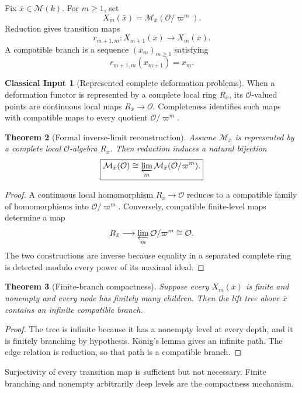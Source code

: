 \documentclass[11pt]{article}
\newtheorem{theorem}{Theorem}[section]
\theoremstyle{definition}
\newtheorem{classicalinput}[theorem]{Classical Input}
\theoremstyle{remark}
\newcommand{\Ocal}{\mathcal O}
\begin{document}
Fix \(\bar x\in\mathcal M(k)\).  For \(m\ge1\), set
\[
X_m(\bar x)=\mathcal M_{\bar x}(\Ocal/\varpi^m).
\]
Reduction gives transition maps
\[
r_{m+1,m}:X_{m+1}(\bar x)\longrightarrow X_m(\bar x).
\]
A compatible branch is a sequence \((x_m)_{m\ge1}\) satisfying
\[
r_{m+1,m}(x_{m+1})=x_m.
\]

\begin{classicalinput}[Represented complete deformation problems]
When a deformation functor is represented by a complete local ring \(R_{\bar x}\), its \(\Ocal\)-valued points are continuous local maps \(R_{\bar x}\to\Ocal\).  Completeness identifies such maps with compatible maps to every quotient \(\Ocal/\varpi^m\).
\end{classicalinput}

\begin{theorem}[Formal inverse-limit reconstruction]
Assume \(\mathcal M_{\bar x}\) is represented by a complete local \(\Ocal\)-algebra \(R_{\bar x}\).  Then reduction induces a natural bijection
\[
\boxed{
\mathcal M_{\bar x}(\Ocal)
\cong
\varprojlim_m
\mathcal M_{\bar x}(\Ocal/\varpi^m).
}
\]
\end{theorem}

\begin{proof}
A continuous local homomorphism \(R_{\bar x}\to\Ocal\) reduces to a compatible family of homomorphisms into \(\Ocal/\varpi^m\).  Conversely, compatible finite-level maps determine a map
\[
R_{\bar x}\longrightarrow\varprojlim_m\Ocal/\varpi^m\cong\Ocal.
\]
The two constructions are inverse because equality in a separated complete ring is detected modulo every power of its maximal ideal.
\end{proof}

\begin{theorem}[Finite-branch compactness]
Suppose every \(X_m(\bar x)\) is finite and nonempty and every node has finitely many children.  Then the lift tree above \(\bar x\) contains an infinite compatible branch.
\end{theorem}

\begin{proof}
The tree is infinite because it has a nonempty level at every depth, and it is finitely branching by hypothesis.  K\"onig's lemma gives an infinite path.  The edge relation is reduction, so that path is a compatible branch.
\end{proof}

Surjectivity of every transition map is sufficient but not necessary.  Finite branching and nonempty arbitrarily deep levels are the compactness mechanism.
\end{document}
